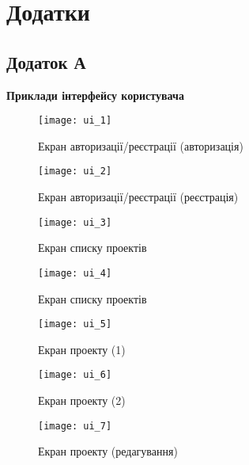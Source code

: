\setcounter{chapter}{1}
\renewcommand\thechapter{\Alph{chapter}}

\chapter*{Додатки}

\centeredsection

\section*{Додаток А}
\begin{center}
	\bfseries Приклади інтерфейсу користувача
\end{center}

\begin{figure}[H]
	\centering
	\texttt{[image: ui\_1]}
	\caption{Екран авторизації/реєстрації (авторизація)}
	\label{scr_ui_auth}
\end{figure}

\begin{figure}[H]
	\centering
	\texttt{[image: ui\_2]}
	\caption{Екран авторизації/реєстрації (реєстрація)}
	\label{scr_ui_signup}
\end{figure}

\begin{figure}[H]
	\centering
	\texttt{[image: ui\_3]}
	\caption{Екран списку проектів}
	\label{scr_ui_projects_list}
\end{figure}

\begin{figure}[H]
	\centering
	\texttt{[image: ui\_4]}
	\caption{Екран списку проектів}
	\label{scr_ui_project_creation}
\end{figure}

\begin{figure}[H]
	\centering
	\texttt{[image: ui\_5]}
	\caption{Екран проекту (1)}
	\label{scr_ui_project_1}
\end{figure}

\begin{figure}[H]
	\centering
	\texttt{[image: ui\_6]}
	\caption{Екран проекту (2)}
	\label{scr_ui_project_2}
\end{figure}

\begin{figure}[H]
	\centering
	\texttt{[image: ui\_7]}
	\caption{Екран проекту (редагування)}
	\label{scr_ui_project_edit}
\end{figure}

